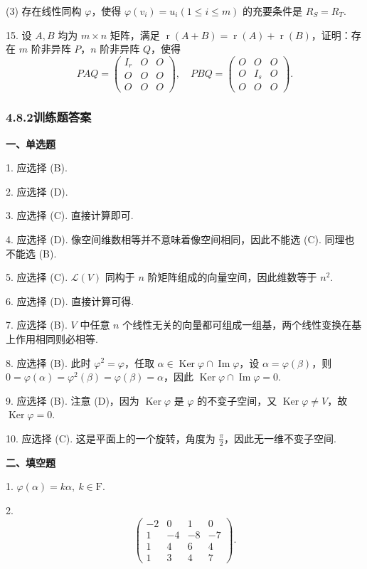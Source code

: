 \documentclass[UTF8,12pt,a4paper,fontset=fandol]{ctexart}
\begin{document}
(3) 存在线性同构 $\varphi$，使得 $\varphi(v_i)=u_i(1\le i\le m)$ 的充要条件是 $R_S=R_T$.

15. 设 $A,B$ 均为 $m\times n$ 矩阵，满足 $\operatorname{r}(A+B)=\operatorname{r}(A)+\operatorname{r}(B)$，证明：存在 $m$ 阶非异阵 $P$，$n$ 阶非异阵 $Q$，使得
\[
PAQ=\left(\begin{array}{ccc}
I_r & O & O\\
O & O & O\\
O & O & O
\end{array}\right),\quad
PBQ=\left(\begin{array}{ccc}
O & O & O\\
O & I_s & O\\
O & O & O
\end{array}\right).
\]

\subsubsection*{4.8.2\quad 训练题答案}

\noindent\textbf{一、单选题}

1. 应选择 (B).

2. 应选择 (D).

3. 应选择 (C). 直接计算即可.

4. 应选择 (D). 像空间维数相等并不意味着像空间相同，因此不能选 (C). 同理也不能选 (B).

5. 应选择 (C). $\mathcal{L}(V)$ 同构于 $n$ 阶矩阵组成的向量空间，因此维数等于 $n^2$.

6. 应选择 (D). 直接计算可得.

7. 应选择 (B). $V$ 中任意 $n$ 个线性无关的向量都可组成一组基，两个线性变换在基上作用相同则必相等.

8. 应选择 (B). 此时 $\varphi^2=\varphi$，任取 $\alpha\in\operatorname{Ker}\varphi\cap\operatorname{Im}\varphi$，设 $\alpha=\varphi(\beta)$，则 $0=\varphi(\alpha)=\varphi^2(\beta)=\varphi(\beta)=\alpha$，因此 $\operatorname{Ker}\varphi\cap\operatorname{Im}\varphi=0$.

9. 应选择 (B). 注意 (D)，因为 $\operatorname{Ker}\varphi$ 是 $\varphi$ 的不变子空间，又 $\operatorname{Ker}\varphi\ne V$，故 $\operatorname{Ker}\varphi=0$.

10. 应选择 (C). 这是平面上的一个旋转，角度为 $\frac{\pi}{2}$，因此无一维不变子空间.

\noindent\textbf{二、填空题}

1. $\varphi(\alpha)=k\alpha,\ k\in\mathrm{F}$.

2.
\[
\left(\begin{array}{rrrr}
-2 & 0 & 1 & 0\\
1 & -4 & -8 & -7\\
1 & 4 & 6 & 4\\
1 & 3 & 4 & 7
\end{array}\right).
\]
\end{document}
